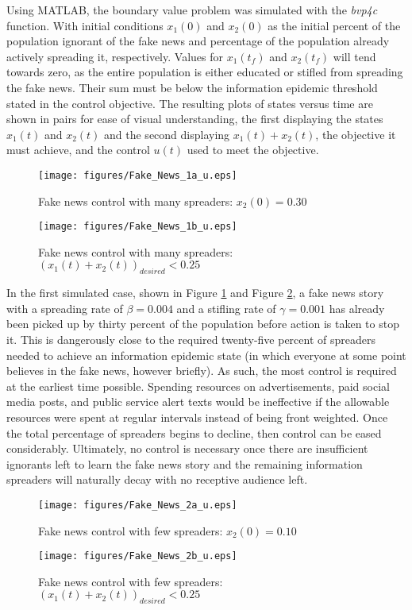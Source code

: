 Using MATLAB, the boundary value problem was simulated with the \textit{bvp4c} function. With initial conditions $x_1(0)$ and $x_2(0)$ as the initial percent of the population ignorant of the fake news and percentage of the population already actively spreading it, respectively. Values for $x_1(t_f)$ and $x_2(t_f)$ will tend towards zero, as the entire population is either educated or stifled from spreading the fake news. Their sum must be below the information epidemic threshold stated in the control objective. The resulting plots of states versus time are shown in pairs for ease of visual understanding, the first displaying the states $x_1(t)$ and $x_2(t)$ and the second displaying $x_1(t)+x_2(t)$, the objective it must achieve, and the control $u(t)$ used to meet the objective.
\begin{figure}[!htbp] \centering
  \texttt{[image: figures/Fake\_News\_1a\_u.eps]}
  \caption{Fake news control with many spreaders: $x_2(0)=0.30$}
  \label{fig:Fake_News_1a}
\end{figure}
\begin{figure}[!htbp] \centering
  \texttt{[image: figures/Fake\_News\_1b\_u.eps]}
  \caption{Fake news control with many spreaders: $(x_1(t)+x_2(t))_{desired}<0.25$}
  \label{fig:Fake_News_1b}
\end{figure}

In the first simulated case, shown in Figure \ref{fig:Fake_News_1a} and Figure \ref{fig:Fake_News_1b}, a fake news story with a spreading rate of $\beta=0.004$ and a stifling rate of $\gamma=0.001$ has already been picked up by thirty percent of the population before action is taken to stop it. This is dangerously close to the required twenty-five percent of spreaders needed to achieve an information epidemic state (in which everyone at some point believes in the fake news, however briefly). As such, the most control is required at the earliest time possible. Spending resources on advertisements, paid social media posts, and public service alert texts would be ineffective if the allowable resources were spent at regular intervals instead of being front weighted. Once the total percentage of spreaders begins to decline, then control can be eased considerably. Ultimately, no control is necessary once there are insufficient ignorants left to learn the fake news story and the remaining information spreaders will naturally decay with no receptive audience left.
\begin{figure}[!htbp] \centering
  \texttt{[image: figures/Fake\_News\_2a\_u.eps]}
  \caption{Fake news control with few spreaders: $x_2(0)=0.10$}
  \label{fig:Fake_News_2a}
\end{figure}
\begin{figure}[!htbp] \centering
  \texttt{[image: figures/Fake\_News\_2b\_u.eps]}
  \caption{Fake news control with few spreaders: $(x_1(t)+x_2(t))_{desired}<0.25$}
  \label{fig:Fake_News_2b}
\end{figure}

